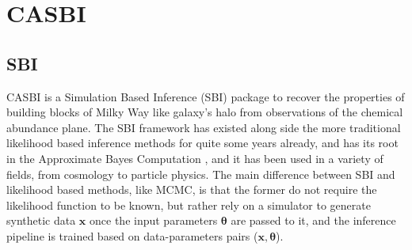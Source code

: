 \chapter{CASBI}

\section{SBI}
CASBI is a Simulation Based Inference (SBI) package to recover the properties of building blocks of Milky Way like galaxy's halo from observations of the chemical abundance plane. The SBI framework has existed along side the more traditional likelihood based inference methods for quite some years already, and has its root in the Approximate Bayes Computation \cite{rubinBayesianlyJustifiableRelevant1984}, and it has been used in a variety of fields, from cosmology to particle physics. The main difference between SBI and likelihood based methods, like MCMC, is that the former do not require the likelihood function to be known, but rather rely on a simulator to generate synthetic data \textbf{$\mathbf{x}$} once the input parameters $\boldsymbol{\theta}$ are passed to it, and the inference pipeline is trained based on data-parameters pairs ($\mathbf{x}, \boldsymbol{\theta}$). 

